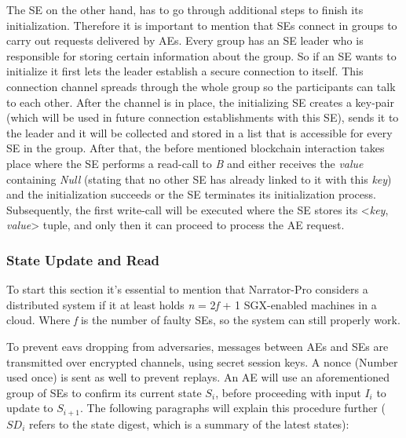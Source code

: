 The SE on the other hand, has to go through additional steps to finish its initialization. Therefore it is important to mention that SEs connect in groups to carry out requests delivered by AEs. Every group has an SE leader who is responsible for storing certain information about the group. So if an SE wants to initialize it first lets the leader establish a secure connection to itself. This connection channel spreads through the whole group so the participants can talk to each other. After the channel is in place, the initializing SE creates a key-pair (which will be used in future connection establishments with this SE), sends it to the leader and it will be collected and stored in a list that is accessible for every SE in the group. After that, the before mentioned blockchain interaction takes place where the SE performs a read-call to \textit{B} and either receives the \textit{value} containing \textit{Null} (stating that no other SE has already linked to it with this \textit{key}) and the initialization succeeds or the SE terminates its initialization process. Subsequently, the first write-call will be executed where the SE stores its <\textit{key}, \textit{value}> tuple, and only then it can proceed to process the AE request.

\subsubsection{State Update and Read}


To start this section it's essential to mention that Narrator-Pro considers a distributed system if it at least holds \textit{n} = 2\textit{f} + 1 SGX-enabled machines in a cloud. Where \textit{f} is the number of faulty SEs, so the system can still properly work.

To prevent eavs dropping from adversaries, messages between AEs and SEs are transmitted over encrypted channels, using secret session keys. A nonce (Number used once) is sent as well to prevent replays. An AE will use an aforementioned group of SEs to confirm its current state \(S_i\), before proceeding with input \(I_i\) to update to \(S_{i+1}\). The following paragraphs will explain this procedure further (\(SD_{i}\) refers to the state digest, which is a summary of the latest states):

